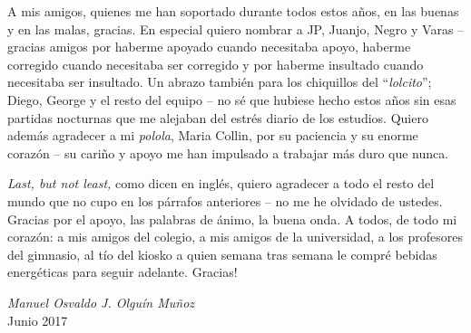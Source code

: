 \begin{thanks}
    A mis amigos, quienes me han soportado durante todos estos años, en las buenas y en las malas, gracias. 
    En especial quiero nombrar a JP, Juanjo, Negro y Varas -- gracias amigos por haberme apoyado cuando necesitaba apoyo, haberme corregido cuando necesitaba ser corregido y por haberme insultado cuando necesitaba ser insultado. 
    Un abrazo también para los chiquillos del ``\emph{lolcito}''; Diego, George y el resto del equipo -- no sé que hubiese hecho estos años sin esas partidas nocturnas que me alejaban del estrés diario de los estudios. 
    Quiero además agradecer a mi \emph{polola}, Maria Collin, por su paciencia y su enorme corazón -- su cariño y apoyo me han impulsado a trabajar más duro que nunca.
    
    \emph{Last, but not least,} como dicen en inglés, quiero agradecer a todo el resto del mundo que no cupo en los párrafos anteriores -- no me he olvidado de ustedes. 
    Gracias por el apoyo, las palabras de ánimo, la buena onda. 
    A todos, de todo mi corazón: a mis amigos del colegio, a mis amigos de la universidad, a los profesores del gimnasio, al tío del kiosko a quien semana tras semana le compré bebidas energéticas para seguir adelante. 
    Gracias!\\
    
    \begin{flushright}
        \textit{Manuel Osvaldo J. Olguín Muñoz}\\
        Junio 2017
    \end{flushright}
\end{thanks}